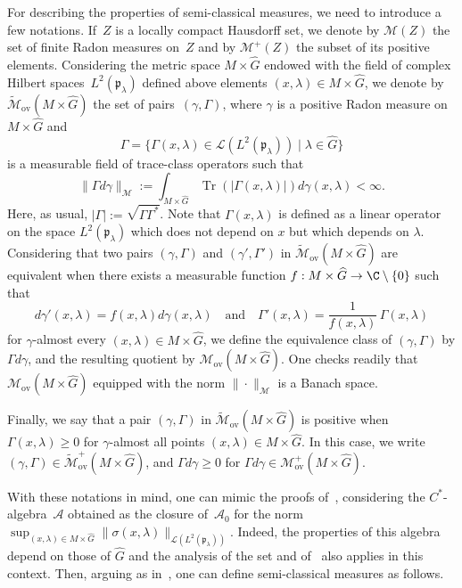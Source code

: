 \documentclass[10pt]{amsart}
\let\mathcal\mathscr
\let\sep\mid
\newcommand{\rov}{\mathrm{ov}}
\DeclareMathOperator{\Tr}{Tr}
\theoremstyle{plain}
\theoremstyle{definition}
\begin{document}
For describing the properties of semi-classical measures, we need to introduce a few notations.
If~$Z$ is a locally compact Hausdorff set, we denote by ${\mathcal M}(Z)$ the set of finite Radon measures on~$Z$ and by ${\mathcal M}^+(Z)$ the subset of its positive elements. Considering the metric space
$M\times \widehat G$ endowed with the field of complex Hilbert spaces~$L^2(\mathfrak p_\lambda)$ defined above elements $(x,\lambda)\in M\times \widehat G$, we denote by
$ \widetilde{\mathcal M}_{\rov}(M\times \widehat G) $
the set of pairs~$(\gamma,\Gamma)$, where $\gamma$ is a positive Radon measure on~$M\times \widehat G$ and
\[
\Gamma=\{\Gamma(x,\lambda)\in {\mathcal L}(L^2(\mathfrak p_\lambda))\sep\lambda \in \widehat G\}
\]
is a measurable field of trace-class operators
such that
\[
\|\Gamma d \gamma\|_{\mathcal M}:=
\int_{M\times \widehat G}\Tr(
|\Gamma(x,\lambda)|)d\gamma(x,\lambda)
<\infty.
\]
Here, as usual, $|\Gamma|:=\sqrt{\Gamma\Gamma^*}$. Note that $\Gamma(x,\lambda)$ is defined as a linear operator on the space $L^2(\mathfrak p_\lambda)$ which does not depend on $x$ but which depends on $\lambda$. Considering that 	
two pairs $(\gamma,\Gamma)$ and $(\gamma',\Gamma')$
in $\widetilde {\mathcal M}_{\rov}(M\times \widehat G)$
are {equivalent} when there exists a measurable function $f:M\times \widehat G\to \C\setminus\{0\}$ such that
\[
d\gamma'(x,\lambda) =f(x,\lambda) d\gamma(x,\lambda)\quad \text{and} \quad \Gamma'(x,\lambda)=\frac 1 {f(x,\lambda)}\, \Gamma(x,\lambda)
\]
for $\gamma$-almost every $(x,\lambda)\in M\times \widehat G $, we define the equivalence class of $(\gamma,\Gamma)$ by $\Gamma d \gamma$,
and the resulting quotient by ${\mathcal M}_{\rov}(M\times \widehat G)$. One checks readily that $\mathcal M_{\rov} (M\times\widehat G)$ equipped with the norm $\| \cdot\|_{{\mathcal M}}$ is a Banach space.

Finally, we say that
a pair $(\gamma,\Gamma)$
in $ \widetilde {\mathcal M}_{\rov}(M\times \widehat G)$
is positive when
$\Gamma(x,\lambda)\geq 0$ for $\gamma$-almost all points $(x,\lambda)\in M\times \widehat G$.
In this case, we write $(\gamma,\Gamma)\in \widetilde {\mathcal M}_{\rov}^+(M\times \widehat G)$,
and $\Gamma d\gamma \geq 0$ for $\Gamma d\gamma \in {\mathcal M}_{\rov}^+(M\times \widehat G)$.

With these notations in mind, one can mimic the proofs of~\cite{FF}, considering the $C^*$-algebra~$\mathcal A$ obtained as the closure of~$\mathcal A_0$ for the norm $\sup _{(x,\lambda)\in M\times \widehat G} \| \sigma(x,\lambda)\|_{\mathcal L(L^2(\mathfrak p_\lambda))}$. Indeed, the properties of this algebra depend on those of $\widehat G$ and the analysis of the set and of~\cite{FF1,FF} also applies in this context. Then, arguing as in~\cite{FF1,FF}, one can define semi-classical measures as follows.
\end{document}
